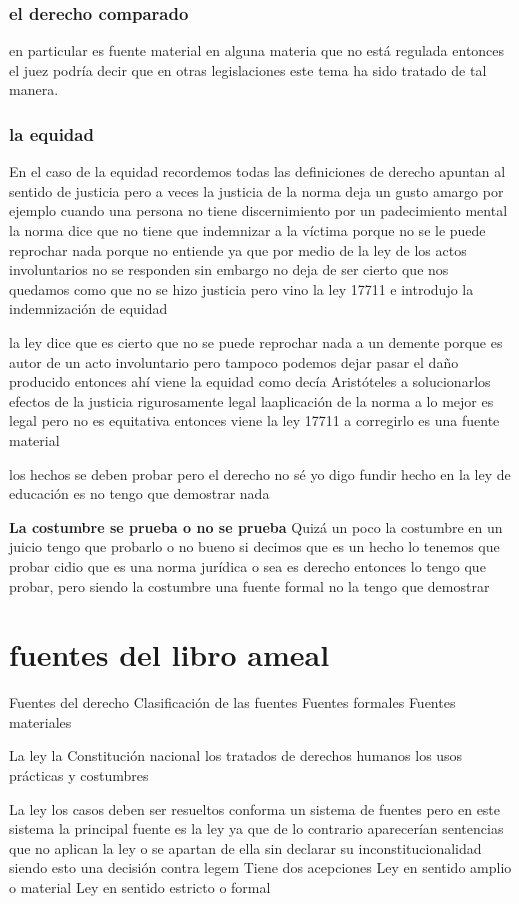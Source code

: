 \documentclass[12pt]{book}
\begin{document}
\subsection{el derecho comparado} en particular es fuente material en alguna materia que no está regulada entonces el juez podría decir que en otras legislaciones este tema ha sido tratado de tal manera.
\subsection{la equidad }
En el caso de la equidad recordemos todas las definiciones de derecho apuntan al sentido de justicia pero a veces la justicia de la norma deja un gusto amargo por ejemplo cuando una persona no tiene discernimiento por un padecimiento mental la norma dice que no tiene que indemnizar a la víctima porque no se le puede reprochar nada porque no entiende ya que por medio de la ley de los actos involuntarios no se responden sin embargo no deja de ser cierto que nos quedamos como que no se hizo justicia pero vino la ley 17711 e introdujo la indemnización de equidad

la ley dice que es cierto que no se puede reprochar nada a un demente porque es autor de un acto involuntario pero tampoco podemos dejar pasar el daño producido entonces ahí viene la equidad como decía Aristóteles a solucionarlos efectos de la justicia rigurosamente legal laaplicación de la norma a lo mejor es legal pero no es equitativa entonces viene la ley 17711 a corregirlo es una fuente material

los hechos se deben probar pero el derecho no sé yo digo fundir hecho en la ley de educación es no tengo que demostrar nada

\textbf{La costumbre se prueba o no se prueba}
Quizá un poco la costumbre en un juicio tengo que probarlo o no bueno si decimos que es un hecho lo tenemos que probar cidio que es una norma jurídica o sea es derecho entonces lo tengo que probar, pero siendo la costumbre una fuente formal no la tengo que demostrar
\chapter{fuentes del libro ameal}
Fuentes del derecho
Clasificación de las fuentes
Fuentes formales
Fuentes materiales

La ley la Constitución nacional los tratados de derechos humanos los usos prácticas y costumbres

La ley los casos deben ser resueltos conforma un sistema de fuentes pero en este sistema la principal fuente es la ley ya que de lo contrario aparecerían sentencias que no aplican la ley o se apartan de ella sin declarar su inconstitucionalidad siendo esto una decisión contra legem
Tiene dos acepciones
Ley en sentido amplio o material
Ley en sentido estricto o formal
\end{document}
